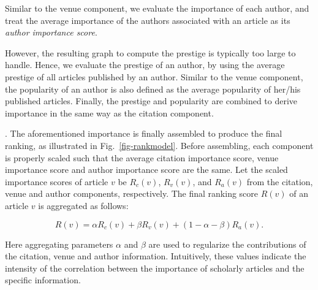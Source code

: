 Similar to the venue component, we evaluate the importance of each author, and treat the average importance of the authors associated with an article as its {\em author importance score}.

However, the resulting graph to compute the prestige is typically too large to handle. Hence, we evaluate the prestige of an author, by using the average prestige of all articles published by an author. Similar to the venue component, the popularity of an author is also defined as the average popularity of her/his published articles. Finally, the prestige and popularity are combined to derive importance in the same way as the citation component.







. The aforementioned importance is finally assembled to produce the final ranking, as illustrated in Fig.~\ref{fig-rankmodel}. Before assembling, each component is properly scaled such that the average citation importance score, venue importance score and author importance score
are the same.  Let the scaled importance scores of article $v$ be $R_c(v)$, $R_v(v)$, and $R_a(v)$ from the citation, venue and author components, respectively. The final ranking score $R(v)$ of an article $v$ is aggregated as follows:
\begin{small}
\begin{equation} \label{eq-ensemble}
R(v) =  \alpha R_c(v) + \beta R_v(v) + (1 - \alpha - \beta) R_a(v).
\end{equation}
\end{small}
\noindent Here aggregating parameters $\alpha$ and $\beta$ are used to regularize the contributions of the citation, venue and author information. Intuitively, these values indicate the intensity of the correlation between the importance of scholarly articles and the specific information.

